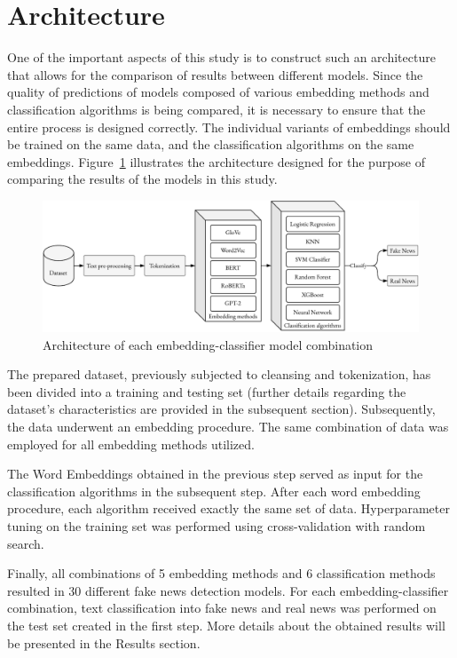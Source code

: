 \section{Architecture}

One of the important aspects of this study is to construct such an architecture that allows for the comparison of results between different models. Since the quality of predictions of models composed of various embedding methods and classification algorithms is being compared, it is necessary to ensure that the entire process is designed correctly. The individual variants of embeddings should be trained on the same data, and the classification algorithms on the same embeddings. Figure~\ref{methodology-schema_extended} illustrates the architecture designed for the purpose of comparing the results of the models in this study.

\begin{figure}
\centering
\includegraphics[width=0.95\linewidth]{methodology-schema_gpt2_extended.pdf}
\caption{Architecture of each embedding-classifier model combination}
\label{methodology-schema_extended}
\end{figure}

The prepared dataset, previously subjected to cleansing and tokenization, has been divided into a training and testing set (further details regarding the dataset's characteristics are provided in the subsequent section). Subsequently, the data underwent an embedding procedure. The same combination of data was employed for all embedding methods utilized.

The Word Embeddings obtained in the previous step served as input for the classification algorithms in the subsequent step. After each word embedding procedure, each algorithm received exactly the same set of data. Hyperparameter tuning on the training set was performed using cross-validation with random search.

Finally, all combinations of 5 embedding methods and 6 classification methods resulted in 30 different fake news detection models. For each embedding-classifier combination, text classification into fake news and real news was performed on the test set created in the first step. More details about the obtained results will be presented in the Results section.

